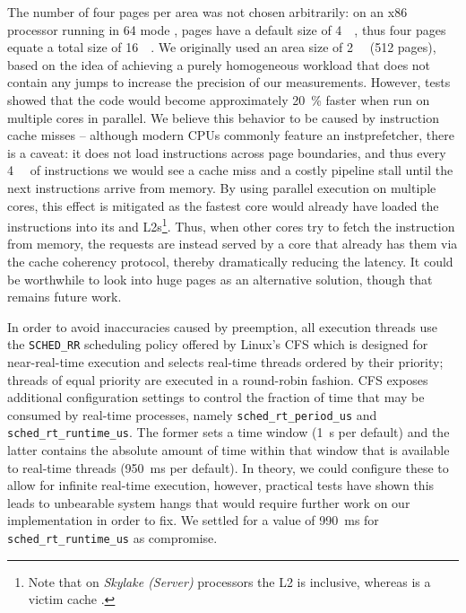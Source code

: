 The number of four pages per area was not chosen arbitrarily: on an \gls{x86} processor running in \SI[number-unit-product=-]{64}{\bit} mode \cite{intelsdmsysprogguide}, pages have a default size of \SI{4}{\kibi\byte}, thus four pages equate a total size of \SI{16}{\kibi\byte}. We originally used an area size of \SI{2}{\mebi\byte} (512 pages), based on the idea of achieving a purely homogeneous workload that does not contain any jumps to increase the precision of our measurements. However, tests showed that the code would become approximately \SI{20}{\percent} faster when run on multiple cores in parallel. We believe this behavior to be caused by instruction cache misses -- although modern \glspl{CPU} commonly feature an \gls{instprefetcher}, there is a caveat: it does not load instructions across page boundaries, and thus every \SI{4}{\kibi\byte} of instructions we would see a cache miss and a costly pipeline stall until the next instructions arrive from memory. By using parallel execution on multiple cores, this effect is mitigated as the fastest core would already have loaded the instructions into its  and \glspl{L2}\footnote{Note that on \textit{Skylake (Server)} processors the \gls{L2} is inclusive, whereas  is a victim cache \cite{intelxeonscalabledeepdive}.}. Thus, when other cores try to fetch the instruction from memory, the requests are instead served by a core that already has them via the cache coherency protocol, thereby dramatically reducing the latency. It could be worthwhile to look into huge pages as an alternative solution, though that remains future work.

In order to avoid inaccuracies caused by preemption, all execution threads use the \texttt{SCHED\_RR} scheduling policy offered by \gls{Linux}'s \gls{CFS} \cite{cfs} which is designed for near-real-time execution and selects real-time threads ordered by their priority; threads of equal priority are executed in a round-robin fashion. \gls{CFS} exposes additional configuration settings \cite{cfsrt} to control the fraction of time that may be consumed by real-time processes, namely \texttt{sched\_rt\_period\_us} and \texttt{sched\_rt\_runtime\_us}. The former sets a time window (\SI{1}{\second} per default) and the latter contains the absolute amount of time within that window that is available to real-time threads (\SI{950}{\milli\second} per default). In theory, we could configure these to allow for infinite real-time execution, however, practical tests have shown this leads to unbearable system hangs that would require further work on our implementation in order to fix. We settled for a value of \SI{990}{\milli\second} for \texttt{sched\_rt\_runtime\_us} as compromise.

